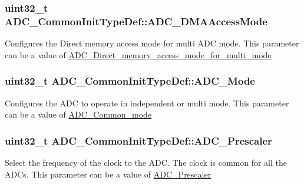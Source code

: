 \subsubsection[{\texorpdfstring{A\+D\+C\+\_\+\+D\+M\+A\+Access\+Mode}{ADC_DMAAccessMode}}]{\setlength{\rightskip}{0pt plus 5cm}uint32\+\_\+t A\+D\+C\+\_\+\+Common\+Init\+Type\+Def\+::\+A\+D\+C\+\_\+\+D\+M\+A\+Access\+Mode}\hypertarget{struct_a_d_c___common_init_type_def_a421063e29be85798195ea5f2e6c26fbd}{}\label{struct_a_d_c___common_init_type_def_a421063e29be85798195ea5f2e6c26fbd}
Configures the Direct memory access mode for multi A\+DC mode. This parameter can be a value of \hyperlink{group___a_d_c___direct__memory__access__mode__for__multi__mode}{A\+D\+C\+\_\+\+Direct\+\_\+memory\+\_\+access\+\_\+mode\+\_\+for\+\_\+multi\+\_\+mode} 
\subsubsection[{\texorpdfstring{A\+D\+C\+\_\+\+Mode}{ADC_Mode}}]{\setlength{\rightskip}{0pt plus 5cm}uint32\+\_\+t A\+D\+C\+\_\+\+Common\+Init\+Type\+Def\+::\+A\+D\+C\+\_\+\+Mode}\hypertarget{struct_a_d_c___common_init_type_def_a9ac2a96e9bbbec4b680ab250051a7b54}{}\label{struct_a_d_c___common_init_type_def_a9ac2a96e9bbbec4b680ab250051a7b54}
Configures the A\+DC to operate in independent or multi mode. This parameter can be a value of \hyperlink{group___a_d_c___common__mode}{A\+D\+C\+\_\+\+Common\+\_\+mode} 
\subsubsection[{\texorpdfstring{A\+D\+C\+\_\+\+Prescaler}{ADC_Prescaler}}]{\setlength{\rightskip}{0pt plus 5cm}uint32\+\_\+t A\+D\+C\+\_\+\+Common\+Init\+Type\+Def\+::\+A\+D\+C\+\_\+\+Prescaler}\hypertarget{struct_a_d_c___common_init_type_def_a4b968331be8f4a43ef31c18f4422df4b}{}\label{struct_a_d_c___common_init_type_def_a4b968331be8f4a43ef31c18f4422df4b}
Select the frequency of the clock to the A\+DC. The clock is common for all the A\+D\+Cs. This parameter can be a value of \hyperlink{group___a_d_c___prescaler}{A\+D\+C\+\_\+\+Prescaler} 
